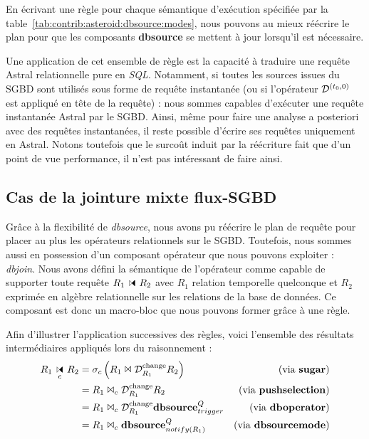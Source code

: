 En écrivant une règle pour chaque sémantique d'exécution spécifiée par la table~\ref{tab:contrib:asteroid:dbsource:modes}, nous pouvons au mieux réécrire le plan pour que les composants \textbf{dbsource} se mettent à jour lorsqu'il est nécessaire.

Une application de cet ensemble de règle est la capacité à traduire une requête Astral relationnelle pure en \textit{SQL}. Notamment, si toutes les sources issues du SGBD sont utilisés sous forme de requête instantanée (ou si l'opérateur $\mathcal{D}^{(t_0,0)}$ est appliqué en tête de la requête) : nous sommes capables d'exécuter une requête instantanée Astral par le SGBD. Ainsi, même pour faire une analyse a posteriori avec des requêtes instantanées, il reste possible d'écrire ses requêtes uniquement en Astral. Notons toutefois que le surcoût induit par la réécriture fait que d'un point de vue performance, il n'est pas intéressant de faire ainsi.

\subsection{Cas de la jointure mixte flux-SGBD}\label{sec:contrib:asteroid:reecriture:join}
Grâce à la flexibilité de \textit{dbsource}, nous avons pu réécrire le plan de requête pour placer au plus les opérateurs relationnels sur le SGBD. Toutefois, nous sommes aussi en possession d'un composant opérateur que nous pouvons exploiter : \textit{dbjoin}. Nous avons défini la sémantique de l'opérateur comme capable de supporter toute requête $R_1\ssjoin R_2$ avec $R_1$ relation temporelle quelconque et $R_2$ exprimée en algèbre relationnelle sur les relations de la base de données. Ce composant est donc un macro-bloc que nous pouvons former grâce à une règle.

Afin d'illustrer l'application successives des règles, voici l'ensemble des résultats intermédiaires appliqués lors du raisonnement :
\begin{align*} 
R_1\ssjoin_c R_2 &= \sigma_c \left(R_1 \Join \D^{\mathrm{change}}_{R_1} R_2\right) & \text{(via \textbf{sugar})}\\
& =  R_1 \Join_c \D^{\mathrm{change}}_{R_1} R_2 & \text{(via \textbf{pushselection})}\\
& =  R_1 \Join_c \D^{\mathrm{change}}_{R_1} \textbf{dbsource}_{trigger}^{Q} & \text{(via \textbf{dboperator})}\\
& =  R_1 \Join_c \textbf{dbsource}_{notify(R_1)}^{Q} & \text{(via \textbf{dbsourcemode})}
\end{align*}


